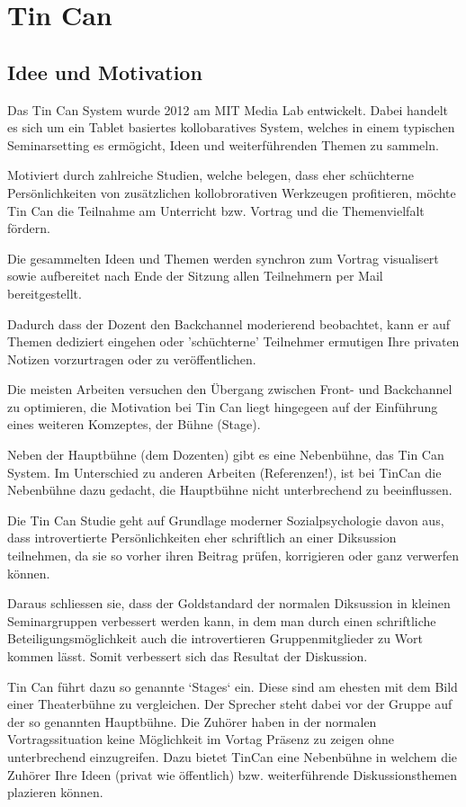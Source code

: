 \section{Tin Can}

\subsection{Idee und Motivation}
Das Tin Can System \cite{HarGorSch2012} wurde 2012 am MIT Media Lab entwickelt.
Dabei handelt es sich um ein Tablet basiertes kollobaratives System, welches in
einem typischen Seminarsetting es ermögicht, Ideen und wei\-ter\-führ\-en\-den
Themen zu sammeln.

Motiviert durch zahlreiche Studien, welche belegen, dass eher schüchterne
Persönlichkeiten von zusätzlichen kollobrorativen Werkzeugen profitieren, möchte
Tin Can die Teilnahme am Unterricht bzw. Vortrag und die Themenvielfalt fördern.

Die gesammelten Ideen und Themen werden synchron zum Vortrag visualisert sowie
aufbereitet nach Ende der Sitzung allen Teilnehmern per Mail bereitgestellt.

Dadurch dass der Dozent den Backchannel moderierend beobachtet, kann er auf
Themen dediziert eingehen oder 'schüchterne' Teilnehmer ermutigen Ihre privaten
Notizen vorzurtragen oder zu veröffentlichen.

Die meisten Arbeiten versuchen den Übergang zwischen Front- und Backchannel zu
optimieren, die Motivation bei Tin Can liegt hingegeen auf der Einführung eines
weiteren Komzeptes, der Bühne (Stage).

Neben der Hauptbühne (dem Dozenten) gibt es eine Nebenbühne, das Tin Can System.
Im Unterschied zu anderen Arbeiten (Referenzen!), ist bei TinCan die Nebenbühne
dazu gedacht, die Hauptbühne nicht unterbrechend zu beeinflussen.

Die Tin Can Studie geht auf Grundlage moderner Sozialpsychologie davon aus, dass
introvertierte Persönlichkeiten eher schriftlich an einer Diksussion teilnehmen,
da sie so vorher ihren Beitrag prüfen, korrigieren oder ganz verwerfen können.

Daraus schliessen sie, dass der Goldstandard der normalen Diksussion in
kleinen Seminargruppen verbessert werden kann, in dem man durch einen
schriftliche Beteiligungsmöglichkeit auch die introvertieren Gruppenmitglieder
zu Wort kommen lässt. Somit verbessert sich das Resultat der Diskussion.

Tin Can führt dazu so genannte `Stages` ein. Diese sind am ehesten mit dem Bild
einer Theaterbühne zu vergleichen. Der Sprecher steht dabei vor der Gruppe auf
der so genannten Hauptbühne. Die Zuhörer haben in der
normalen Vortragssituation keine Möglichkeit im Vortag Präsenz zu zeigen ohne
unterbrechend einzugreifen. Dazu bietet TinCan eine Nebenbühne in welchem die
Zuhörer Ihre Ideen (privat wie öffentlich) bzw. weiterführende Diskussionsthemen
plazieren können.
 
